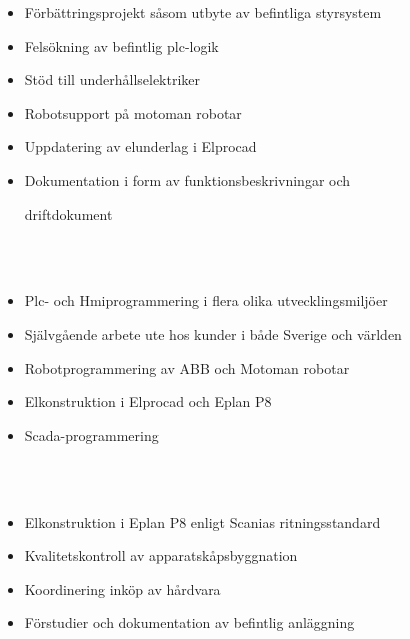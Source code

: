 \documentclass[10pt,a4paper,ragged2e,withhyper]{altacv}
\begin{document}
\begin{paracol}{2}

\begin{itemize}
\item Förbättringsprojekt såsom utbyte av befintliga styrsystem
\item Felsökning av befintlig plc-logik
\item Stöd till underhållselektriker
\item Robotsupport på motoman robotar
\item Uppdatering av elunderlag i Elprocad
\item Dokumentation i form av funktionsbeskrivningar och
 
driftdokument
\end{itemize}
\\
\\
\divider

\begin{itemize}
\item Plc- och Hmiprogrammering i flera olika utvecklingsmiljöer
\item Självgående arbete ute hos kunder i både Sverige och världen
\item Robotprogrammering av ABB och Motoman robotar
\item Elkonstruktion i Elprocad och Eplan P8
\item Scada-programmering
\end{itemize}
\\
\\

\begin{itemize}
\item Elkonstruktion i Eplan P8 enligt Scanias ritningsstandard
\item Kvalitetskontroll av apparatskåpsbyggnation
\item Koordinering inköp av hårdvara
\item Förstudier och dokumentation av befintlig anläggning
\end{itemize}


\end{paracol}
\end{document}

